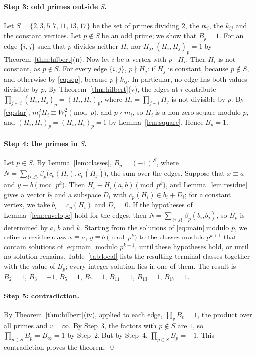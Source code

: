 \documentclass[11pt]{article}
\begin{document}
\paragraph{Step 3: odd primes outside $S$.} Let $S=\{2,3,5,7,11,13,17\}$ be the set of primes dividing $2$, the $m_{i}$, the $k_{ij}$ and the constant vertices. Let $p\notin S$ be an odd prime; we show that $B_p=1$. For an edge $\{i,j\}$ such that $p$ divides neither $H_i$ nor $H_j$, $(H_i,H_j)_p=1$ by Theorem~\ref{thm:hilbert}(ii). Now let $i$ be a vertex with $p\mid H_i$. Then $H_i$ is not constant, as $p\notin S$. For every edge $\{i,j\}$, $p\nmid H_j$: if $H_j$ is constant, because $p\notin S$, and otherwise by \eqref{eq:sep}, because $p\nmid k_{ij}$. In particular, no edge has both values divisible by $p$. By Theorem~\ref{thm:hilbert}(v), the edges at $i$ contribute $\prod_{j\sim i}(H_i,H_j)_p=(H_i,\Pi_i)_p$, where $\Pi_i=\prod_{j\sim i}H_j$ is not divisible by $p$. By \eqref{eq:star}, $m_i^2\Pi_i\equiv W_i^2\pmod p$, and $p\nmid m_i$, so $\Pi_i$ is a non-zero square modulo $p$, and $(H_i,\Pi_i)_p=(\Pi_i,H_i)_p=1$ by Lemma~\ref{lem:square}. Hence $B_p=1$.

\paragraph{Step 4: the primes in $S$.} Let $p\in S$. By Lemma~\ref{lem:classes}, $B_p=(-1)^{N}$, where $N=\sum_{\{i,j\}}\beta_p\bigl(c_p(H_i),c_p(H_j)\bigr)$, the sum over the edges. Suppose that $x\equiv a$ and $y\equiv b\pmod{p^k}$. Then $H_i\equiv H_i(a,b)\pmod{p^k}$, and Lemma~\ref{lem:residue} gives a vector $b_i$ and a subspace $D_i$ with $c_p(H_i)\in b_i+D_i$; for a constant vertex, we take $b_i=c_p(H_i)$ and $D_i=0$. If the hypotheses of Lemma~\ref{lem:envelope} hold for the edges, then $N=\sum_{\{i,j\}}\beta_p(b_i,b_j)$, so $B_p$ is determined by $a$, $b$ and $k$. Starting from the solutions of \eqref{eq:main} modulo $p$, we refine a residue class $x\equiv a$, $y\equiv b\pmod{p^k}$ to the classes modulo $p^{k+1}$ that contain solutions of \eqref{eq:main} modulo $p^{k+1}$, until these hypotheses hold, or until no solution remains. Table~\ref{tab:local} lists the resulting terminal classes together with the value of $B_p$; every integer solution lies in one of them. The result is $B_{2}=1$, $B_{3}=-1$, $B_{5}=1$, $B_{7}=1$, $B_{11}=1$, $B_{13}=1$, $B_{17}=1$.

\paragraph{Step 5: contradiction.} By Theorem~\ref{thm:hilbert}(iv), applied to each edge, $\prod_vB_v=1$, the product over all primes and $v=\infty$. By Step~3, the factors with $p\notin S$ are $1$, so $\prod_{p\in S}B_p=B_\infty=1$ by Step~2. But by Step~4, $\prod_{p\in S}B_p=-1$. This contradiction proves the theorem.
\qed
\end{document}
